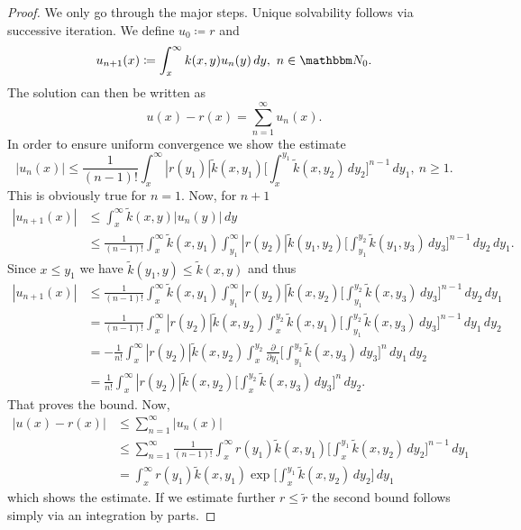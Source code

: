 \begin{proof}
We only go through the major steps. Unique solvability follows via successive iteration. 
We define $u_0\coloneqq r$ and
\begin{equation*}
  u_{n+1}(x) \coloneqq \int_x^\infty k(x,y) u_n(y)\, dy,\ n\in\N_0 .
\end{equation*}
The solution can then be written as
\begin{equation*}
  u(x) - r(x) = \sum_{n=1}^\infty u_n(x) .
\end{equation*}
In order to ensure uniform convergence we show the estimate
\begin{equation*}
  |u_n(x)| \leq \frac{1}{(n-1)!} \int_x^\infty |r(y_1)|\tilde k(x,y_1) \big[ \int_x^{y_1} \tilde k(x,y_2)\, dy_2\big]^{n-1}\, dy_1,\ n\geq 1.
\end{equation*}
This is obviously true for $n=1$. Now, for $n+1$
\begin{equation*}
\begin{split}
  |u_{n+1}(x)| 
    & \leq \int_x^\infty \tilde k(x,y) |u_n(y)| \, dy \\
    & \leq \frac{1}{(n-1)!}\int_x^\infty \tilde k(x,y_1) \int_{y_1}^\infty |r(y_2)| \tilde k(y_1,y_2)
              \big[\int_{y_1}^{y_2} \tilde k(y_1,y_3)\, dy_3\big]^{n-1}\, dy_2\, dy_1 .
\end{split}
\end{equation*}
Since $x\leq y_1$ we have $\tilde k(y_1,y)\leq \tilde k(x,y)$ and thus
\begin{equation*}
\begin{split}
  |u_{n+1}(x)| 
     & \leq \frac{1}{(n-1)!}\int_x^\infty \tilde k(x,y_1) \int_{y_1}^\infty |r(y_2)| \tilde k(x,y_2)
              \big[\int_{y_1}^{y_2} \tilde k(x,y_3)\, dy_3\big]^{n-1}\, dy_2\, dy_1\\
     & = \frac{1}{(n-1)!} \int_x^\infty |r(y_2)|\tilde k(x,y_2) 
           \int_x^{y_2} \tilde k(x,y_1)\big[ \int_{y_1}^{y_2} \tilde k(x,y_3)\, dy_3\big]^{n-1}\, dy_1\, dy_2\\
     & = - \frac{1}{n!} \int_x^\infty |r(y_2)|\tilde k(x,y_2)
           \int_x^{y_2}\frac{\partial}{\partial y_1} \big[ \int_{y_1}^{y_2}\tilde k(x,y_3)\, dy_3\big]^n \, dy_1\, dy_2\\
     & = \frac{1}{n!} \int_x^\infty |r(y_2)|\tilde k(x,y_2)\big[ \int_x^{y_2}\tilde k(x,y_3)\, dy_3\big]^n\, dy_2 .
\end{split}
\end{equation*}
That proves the bound. Now,
\begin{equation*}
\begin{split}
  |u(x)-r(x)|
    & \leq \sum_{n=1}^\infty |u_n(x)|\\
    & \leq \sum_{n=1}^\infty \frac{1}{(n-1)!} \int_x^\infty r(y_1)\tilde k(x,y_1)\big[ \int_x^{y_1}\tilde k(x,y_2)\, dy_2\big]^{n-1}\, dy_1\\
    &  =   \int_x^\infty r(y_1) \tilde k(x,y_1)\exp\big[\int_x^{y_1}\tilde k(x,y_2)\, dy_2\big]\, dy_1
\end{split}
\end{equation*}
which shows the estimate. If we estimate further $r\leq\tilde r$ the second bound follows simply via an integration by parts.
\end{proof}

